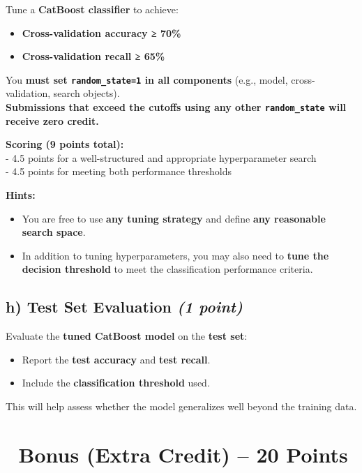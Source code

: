 \documentclass[
  letterpaper,
  DIV=11,
  numbers=noendperiod]{scrreprt}
\providecommand{\tightlist}{%
  \setlength{\itemsep}{0pt}\setlength{\parskip}{0pt}}\usepackage{longtable,booktabs,array}
\begin{document}
Tune a \textbf{CatBoost classifier} to achieve:

\begin{itemize}
\tightlist
\item
  \textbf{Cross-validation accuracy ≥ 70\%}
\item
  \textbf{Cross-validation recall ≥ 65\%}
\end{itemize}

You \textbf{must set \texttt{random\_state=1} in all components} (e.g.,
model, cross-validation, search objects).\\
\textbf{Submissions that exceed the cutoffs using any other
\texttt{random\_state} will receive zero credit.}

\textbf{Scoring (9 points total):}\\
- 4.5 points for a well-structured and appropriate hyperparameter
search\\
- 4.5 points for meeting both performance thresholds

\textbf{Hints:}

\begin{itemize}
\tightlist
\item
  You are free to use \textbf{any tuning strategy} and define
  \textbf{any reasonable search space}.
\item
  In addition to tuning hyperparameters, you may also need to
  \textbf{tune the decision threshold} to meet the classification
  performance criteria.
\end{itemize}

\subsection{\texorpdfstring{h) Test Set Evaluation \emph{(1
point)}}{h) Test Set Evaluation (1 point)}}\label{h-test-set-evaluation-1-point}

Evaluate the \textbf{tuned CatBoost model} on the \textbf{test set}:

\begin{itemize}
\tightlist
\item
  Report the \textbf{test accuracy} and \textbf{test recall}.
\item
  Include the \textbf{classification threshold} used.
\end{itemize}

This will help assess whether the model generalizes well beyond the
training data.

\section{🎁 Bonus (Extra Credit) -- 20
Points}\label{bonus-extra-credit-20-points}
\end{document}
